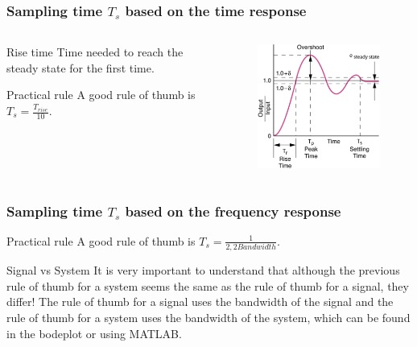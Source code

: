 \begin{frame}
	\frametitle{Sampling time $T_s$ based on the time response}
\begin{columns}
	\begin{column}{0.5\textwidth}
	\begin{block}{Rise time}
		Time needed to reach the steady state for the first time.
	\end{block}
	\begin{block}{Practical rule}
		A good rule of thumb is $T_s = \frac{T_{rise}}{10}$.
	\end{block}
	\end{column}
	
	\begin{column}{0.5\textwidth}
		\begin{figure}
			\centering
			\includegraphics[width=1\linewidth]{rise_time}
		\end{figure}
	\end{column}
\end{columns}
\end{frame}

\begin{frame}
	\frametitle{Sampling time $T_s$ based on the frequency response}
	\begin{block}{Practical rule}
		A good rule of thumb is $T_s = \frac{1}{2,2Bandwidth}$.
	\end{block}
	\begin{alertblock}{Signal vs System}
		It is very important to understand that although the previous rule of thumb for a system seems the same as the rule of thumb for a signal, they differ! The rule of thumb for a signal uses the bandwidth of the signal and the rule of thumb for a system uses the bandwidth of the system, which can be found in the bodeplot or using MATLAB.
	\end{alertblock}
\end{frame}

